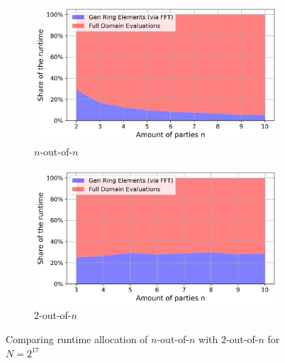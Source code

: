 \begin{figure}[t]
    \hspace{-1em}
    \begin{subfigure}[b]{0.5\textwidth}
        \centering
        \includegraphics[scale=0.49]{images/plots/bbs_noutofN_percentage_dist.png}
        \caption{$n$-out-of-$n$}
    \end{subfigure}
    \hspace{0em}
    \begin{subfigure}[b]{0.5\textwidth}
        \centering
        \includegraphics[scale=0.49]{images/plots/bbs_TAUoutofN_percentage_dist.png}
        \caption{$2$-out-of-$n$}
    \end{subfigure}
    \label{fig:runtimeAllocationComparision}
    \caption{Comparing runtime allocation of $n$-out-of-$n$ with $2$-out-of-$n$ for $N=2^{17}$}
\end{figure}

